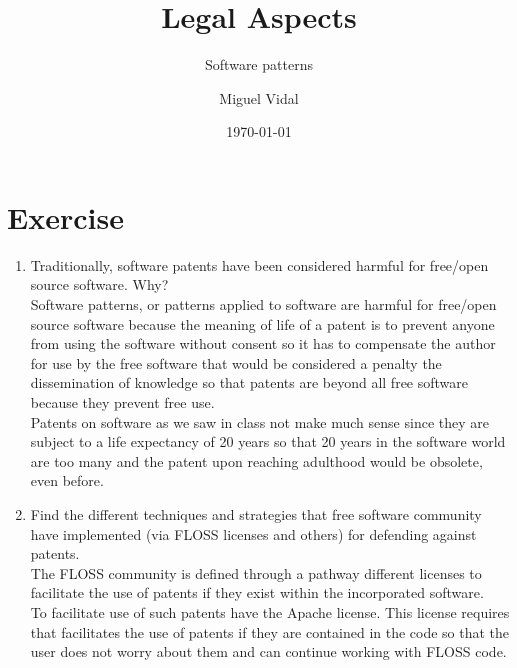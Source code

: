 \documentclass[11pt]{scrartcl}
\title{\textbf{Legal Aspects}}
\subtitle{Software patterns}
\author{Miguel Vidal}
\date{\today}
\begin{document}
\maketitle

\section{Exercise}

\begin{enumerate}
	\item Traditionally, software patents have been considered harmful for free/open source software. Why?\\

	Software patterns, or patterns applied to software are harmful for free/open source software because the meaning of life of a patent is to prevent anyone from using the software without consent so it has to compensate the author for use by the free software that would be considered a penalty the dissemination of knowledge so that patents are beyond all free software because they prevent free use.\\

	Patents on software as we saw in class not make much sense since they are subject to a life expectancy of 20 years so that 20 years in the software world are too many and the patent upon reaching adulthood would be obsolete, even before.

	\item Find the different techniques and strategies that free software community have implemented (via FLOSS licenses and others) for defending against patents.\\

	The FLOSS community is defined through a pathway different licenses to facilitate the use of patents if they exist within the incorporated software.\\

	To facilitate use of such patents have the Apache license. This license requires that facilitates the use of patents if they are contained in the code so that the user does not worry about them and can continue working with FLOSS code.
\end{enumerate}
 
\end{document}
